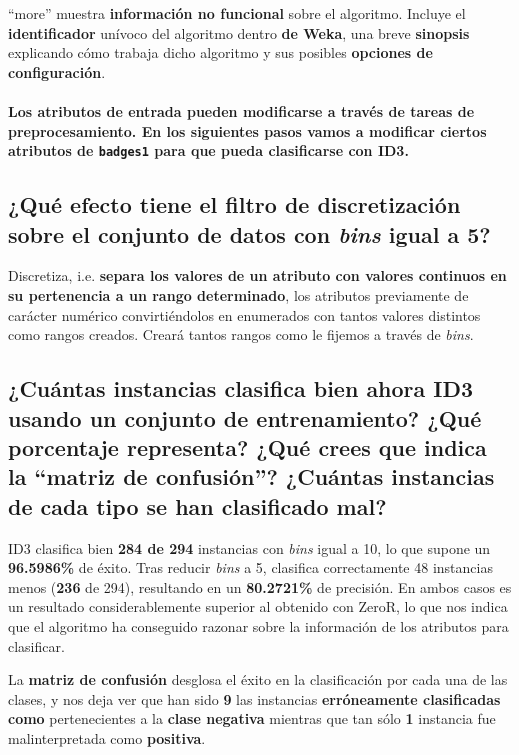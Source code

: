 \documentclass[12pt]{article}
\begin{document}
``more'' muestra \textbf{información no funcional} sobre el algoritmo. Incluye el \textbf{identificador} unívoco del algoritmo dentro \textbf{de Weka}, una breve \textbf{sinopsis} explicando cómo trabaja dicho algoritmo y sus posibles \textbf{opciones de configuración}.

\paragraph{\small Los atributos de entrada pueden modificarse a través de tareas de preprocesamiento. En los siguientes pasos vamos a modificar ciertos atributos de \texttt{badges1} para que pueda clasificarse con ID3.}

\subsection*{\small ¿Qué efecto tiene el filtro de discretización sobre el conjunto de datos con \emph{bins} igual a 5?}

Discretiza, i.e. \textbf{separa los valores de un atributo con valores continuos en su pertenencia a un rango determinado}, los atributos previamente de carácter numérico convirtiéndolos en enumerados con tantos valores distintos como rangos creados. Creará tantos rangos como le fijemos a través de \emph{bins}.

\subsection*{\small ¿Cuántas instancias clasifica bien ahora ID3 usando un conjunto de entrenamiento? ¿Qué porcentaje representa? ¿Qué crees que indica la ``matriz de confusión''? ¿Cuántas instancias de cada tipo se han clasificado mal?}

ID3 clasifica bien \textbf{284 de 294} instancias con \emph{bins} igual a 10, lo que supone un \textbf{96.5986\%} de éxito. Tras reducir \emph{bins} a 5, clasifica correctamente 48 instancias menos (\textbf{236} de 294), resultando en un \textbf{80.2721\%} de precisión. En ambos casos es un resultado considerablemente superior al obtenido con ZeroR, lo que nos indica que el algoritmo ha conseguido razonar sobre la información de los atributos para clasificar.

La \textbf{matriz de confusión} desglosa el éxito en la clasificación por cada una de las clases, y nos deja ver que han sido \textbf{9} las instancias \textbf{erróneamente clasificadas como} pertenecientes a la \textbf{clase negativa} mientras que tan sólo \textbf{1} instancia fue malinterpretada como \textbf{positiva}.
\end{document}
